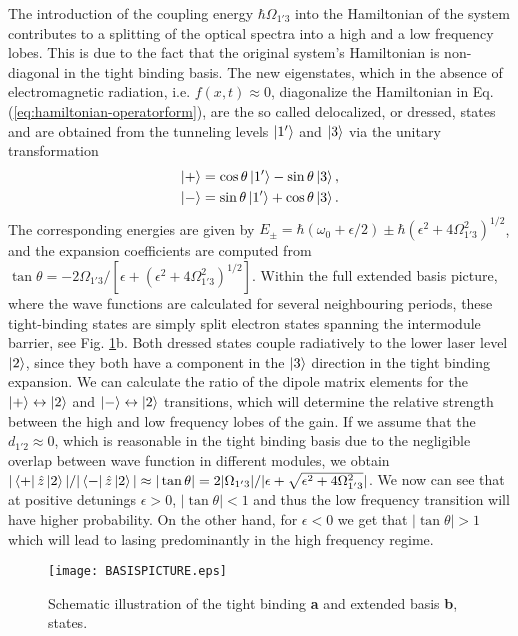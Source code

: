 \documentclass[]{spie}  %
\begin{document}
 The introduction of the coupling energy $\hbar \Omega_{1'3}$ into the Hamiltonian of the system contributes to a splitting of the optical spectra into a high and a low frequency lobes. This is due to the fact that the original system's Hamiltonian is non-diagonal in the tight binding basis. The new eigenstates, which in the absence of electromagnetic radiation, i.e. $f(x,t) \approx 0$, diagonalize the Hamiltonian in Eq. (\ref{eq:hamiltonian-operatorform}), are the so called delocalized, or dressed, states and are obtained from the tunneling levels $\Ket{1'}$ and $\Ket{3}$ via the unitary transformation
 \begin{align}
 \label{eq:dressedstates}
 \Ket{+} &= \cos\theta \Ket{1'} - \sin\theta \Ket{3}, \nonumber \\
 \Ket{-} &= \sin\theta \Ket{1'} + \cos\theta \Ket{3}.
 \end{align}
 The corresponding energies are given by $E_\pm =\hbar(\omega_0 +\epsilon/2) \pm \hbar \left(\epsilon^2+4\Omega_{1'3}^2\right )^{1/2}$, and the expansion coefficients are computed from   
 $
 \tan \theta = -2\Omega_{1'3}/[\epsilon+(\epsilon^2+4\Omega_{1'3}^2)^{1/2}].
 $
 Within the full extended basis picture, where the wave functions are calculated for several neighbouring periods, these tight-binding states are simply split electron states spanning the intermodule barrier, see Fig. \ref{fig:basis_schemata}b. Both dressed states  couple radiatively to the lower laser level $\ket{2}$, since they both have a component in the $\ket{3}$ direction in the tight binding expansion. We can calculate the ratio of the dipole matrix elements for the $\Ket{+}\leftrightarrow\Ket{2}$ and $\Ket{-}\leftrightarrow\Ket{2}$ transitions, which will determine the relative strength between the high and low frequency lobes of the gain. If we assume that the $d_{1'2} \approx 0$, which is reasonable in the tight binding basis due to the negligible overlap between wave function in different modules, we obtain  $|\Bra{+}\hat{z}\Ket{2}|/|\Bra{-}\hat{z}\Ket{2} | \approx |\tan\theta| =  2|\Omega_{1'3}|/|\epsilon+\sqrt{\epsilon^2+4\Omega_{1'3}^2}|$. We now can see that at positive detunings $\epsilon >0$, $|\tan\theta|<1$ and thus the low frequency transition will have higher probability. On the other hand, for $\epsilon < 0 $ we get that $|\tan\theta| >1$ which will lead to lasing predominantly in the high frequency regime.

\begin{figure}[h!]
	\begin{center}
		\texttt{[image: BASISPICTURE.eps]}
		\caption{ Schematic illustration of the tight binding \textbf{a} and extended basis \textbf{b}, states.  } \label{fig:basis_schemata}
	\end{center}	
\end{figure}
\end{document}

